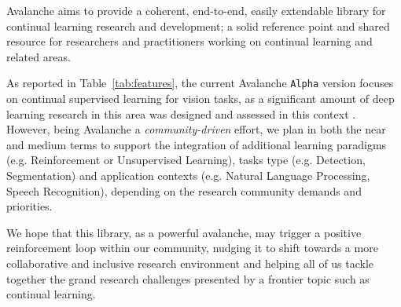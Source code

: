 \documentclass[final]{cvpr}
\theoremstyle{definition}
\def\confYear{CVPR 2021}
\begin{document}
Avalanche aims to provide a coherent, end-to-end, easily extendable library for continual learning research and development; a solid reference point and shared resource for researchers and practitioners working on continual learning and related areas.

As reported in Table~\ref{tab:features}, the current Avalanche \texttt{Alpha} version focuses on continual supervised learning for vision tasks, as a significant amount of deep learning research in this area was designed and assessed in this context \cite{hadsell2020}. However, being Avalanche a \emph{community-driven} effort, we plan in both the near and medium terms to support the integration of additional learning paradigms (e.g. Reinforcement or Unsupervised Learning), tasks type (e.g. Detection, Segmentation) and application contexts (e.g. Natural Language Processing, Speech Recognition), depending on the research community demands and priorities.

We hope that this library, as a powerful avalanche, may trigger a positive reinforcement loop within our community, nudging it to shift towards a more collaborative and inclusive research environment and helping all of us tackle together the grand research challenges presented by a frontier topic such as continual learning.





\end{document}
